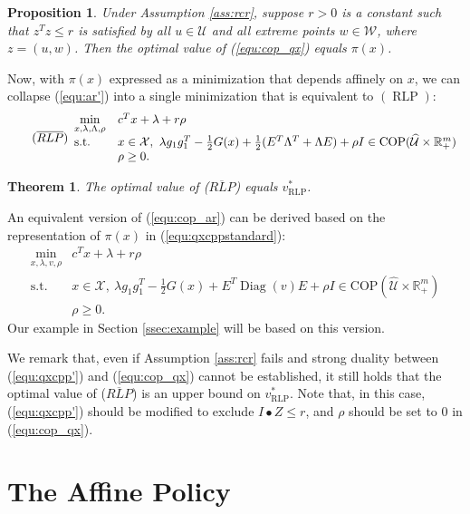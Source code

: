 \documentclass[12pt]{article}
\DeclareMathOperator{\st}{s.t.}
\DeclareMathOperator{\Diag}{Diag}
\DeclareMathOperator{\AR}{RLP}
\newtheorem{theorem}{Theorem}
\newtheorem{proposition}{Proposition}
\newcommand{\U}{{\mathcal{U}}}
\newcommand{\W}{{\mathcal{W}}}
\newcommand{\K}{\widehat{\mathcal{U}}}
\newcommand{\COP}{{\mathrm{COP}}}
\newcommand{\X}{{\mathcal{X}}}
\newcommand{\p}{\pi}
\def\RR{{\mathbb{R}}}
\newcommand{\Q}{{\K \times \RR^m_+}}
\begin{document}
\begin{onehalfspace}
\begin{proposition} %
Under Assumption \ref{ass:rcr}, suppose $r > 0$ is a constant such that
$z^T z \le r$ is satisfied by all $u \in \U$ and all extreme points $w
\in \W$, where $z = (u,w)$. Then the optimal value of (\ref{equ:cop_qx})
equals $\p(x)$.
\end{proposition}

Now, with $\p(x)$ expressed as a minimization that depends affinely on
$x$, we can collapse (\ref{equ:ar'}) into a single minimization that
is equivalent to $(\AR)$:
%
\begin{equation} \tag{$\overline{RLP}$} \label{equ:cop_ar} 
\begin{array}{ll}
\min \limits_{x, \lambda, \Lambda, \rho} & c^T x + \lambda + r \rho \\
\st & x \in \X, \
\lambda g_1 g_1^T - \tfrac12 G(x) + \tfrac12(E^T \Lambda^T + \Lambda E) + \rho I
\in \COP(\Q) \\ & \rho \ge 0.
\end{array}
\end{equation}

\begin{theorem} \label{thm:equivalence}
The optimal value of ($\overline{RLP}$) equals $v^*_{\AR}$.
\end{theorem}

An equivalent version of (\ref{equ:cop_ar}) can be derived
based on the representation of $\p(x)$ in
(\ref{equ:qxcppstandard}):
\begin{equation} \label{equ:cop_ar'} 
\begin{array}{ll}
\min \limits_{x, \lambda, v, \rho} & c^T x + \lambda + r \rho \\
\st & x \in \X, \
\lambda g_1 g_1^T - \tfrac12 G(x) + E^T\Diag(v)E + \rho I
\in \COP(\Q) \\ & \rho \ge 0.
\end{array}
\end{equation}
Our example in Section \ref{ssec:example} will be based
on this version.

We remark that, even if Assumption \ref{ass:rcr} fails and strong
duality between (\ref{equ:qxcpp'}) and (\ref{equ:cop_qx}) cannot be
established, it still holds that the optimal value of ($\overline{RLP}$)
is an upper bound on $v^*_{\AR}$. Note that, in this case,
(\ref{equ:qxcpp'}) should be modified to exclude $I \bullet Z \le r$,
and $\rho$ should be set to 0 in (\ref{equ:cop_qx}).

\section{The Affine Policy} \label{sec:tractableaffine}


\end{onehalfspace}
\end{document}

